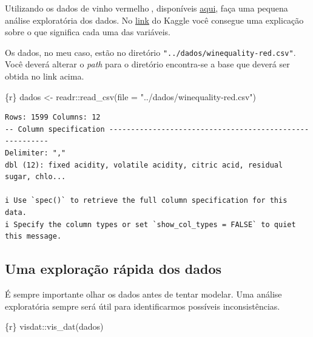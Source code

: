 \documentclass[
  letterpaper,
  DIV=11,
  numbers=noendperiod,
  oneside]{scrartcl}
\newenvironment{Shaded}{\begin{snugshade}}{\end{snugshade}}
\newcommand{\AttributeTok}[1]{\textcolor[rgb]{0.40,0.45,0.13}{#1}}
\newcommand{\FunctionTok}[1]{\textcolor[rgb]{0.28,0.35,0.67}{#1}}
\newcommand{\InformationTok}[1]{\textcolor[rgb]{0.37,0.37,0.37}{#1}}
\newcommand{\NormalTok}[1]{\textcolor[rgb]{0.00,0.23,0.31}{#1}}
\newcommand{\OtherTok}[1]{\textcolor[rgb]{0.00,0.23,0.31}{#1}}
\newcommand{\SpecialCharTok}[1]{\textcolor[rgb]{0.37,0.37,0.37}{#1}}
\newcommand{\StringTok}[1]{\textcolor[rgb]{0.13,0.47,0.30}{#1}}
\begin{document}
Utilizando os dados de vinho vermelho🍷, disponíveis
\href{https://www.kaggle.com/datasets/uciml/red-wine-quality-cortez-et-al-2009}{aqui},
faça uma pequena análise exploratória dos dados. No
\href{https://www.kaggle.com/datasets/uciml/red-wine-quality-cortez-et-al-2009}{link}
do Kaggle você consegue uma explicação sobre o que significa cada uma
das variáveis.

Os dados, no meu caso, estão no diretório
\texttt{"../dados/winequality-red.csv"}. Você deverá alterar o
\emph{path} para o diretório encontra-se a base que deverá ser obtida no
link acima.

\begin{Shaded}
\begin{Highlighting}[]
\InformationTok{\textasciigrave{}\textasciigrave{}\textasciigrave{}\{r\}}
\NormalTok{dados }\OtherTok{\textless{}{-}}\NormalTok{ readr}\SpecialCharTok{::}\FunctionTok{read\_csv}\NormalTok{(}\AttributeTok{file =} \StringTok{"../dados/winequality{-}red.csv"}\NormalTok{)}
\InformationTok{\textasciigrave{}\textasciigrave{}\textasciigrave{}}
\end{Highlighting}
\end{Shaded}

\begin{verbatim}
Rows: 1599 Columns: 12
-- Column specification --------------------------------------------------------
Delimiter: ","
dbl (12): fixed acidity, volatile acidity, citric acid, residual sugar, chlo...

i Use `spec()` to retrieve the full column specification for this data.
i Specify the column types or set `show_col_types = FALSE` to quiet this message.
\end{verbatim}

\hypertarget{uma-explorauxe7uxe3o-ruxe1pida-dos-dados}{%
\subsection{Uma exploração rápida dos
dados}\label{uma-explorauxe7uxe3o-ruxe1pida-dos-dados}}

É sempre importante olhar os dados antes de tentar modelar. Uma análise
exploratória sempre será útil para identificarmos possíveis
inconsistências.

\begin{Shaded}
\begin{Highlighting}[]
\InformationTok{\textasciigrave{}\textasciigrave{}\textasciigrave{}\{r\}}
\NormalTok{visdat}\SpecialCharTok{::}\FunctionTok{vis\_dat}\NormalTok{(dados)}
\InformationTok{\textasciigrave{}\textasciigrave{}\textasciigrave{}}
\end{Highlighting}
\end{Shaded}
\end{document}
